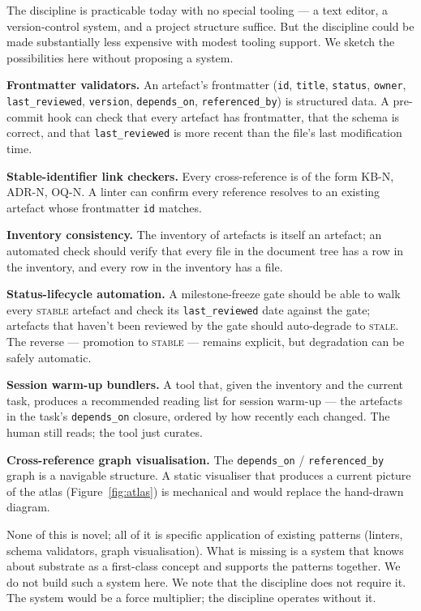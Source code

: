 \documentclass[11pt,a4paper,twocolumn]{article}
\begin{document}
The discipline is practicable today with no special tooling --- a
text editor, a version-control system, and a project structure
suffice. But the discipline could be made substantially less
expensive with modest tooling support. We sketch the possibilities
here without proposing a system.

\textbf{Frontmatter validators.} An artefact's frontmatter
(\texttt{id}, \texttt{title}, \texttt{status}, \texttt{owner},
\texttt{last\_reviewed}, \texttt{version},
\texttt{depends\_on}, \texttt{referenced\_by}) is structured data.
A pre-commit hook can check that every artefact has frontmatter,
that the schema is correct, and that \texttt{last\_reviewed} is
more recent than the file's last modification time.

\textbf{Stable-identifier link checkers.} Every cross-reference is
of the form KB-N, ADR-N, OQ-N. A linter can confirm every
reference resolves to an existing artefact whose frontmatter
\texttt{id} matches.

\textbf{Inventory consistency.} The inventory of artefacts is
itself an artefact; an automated check should verify that every
file in the document tree has a row in the inventory, and every
row in the inventory has a file.

\textbf{Status-lifecycle automation.} A milestone-freeze gate
should be able to walk every \textsc{stable} artefact and check
its \texttt{last\_reviewed} date against the gate; artefacts that
haven't been reviewed by the gate should auto-degrade to
\textsc{stale}. The reverse --- promotion to \textsc{stable} ---
remains explicit, but degradation can be safely automatic.

\textbf{Session warm-up bundlers.} A tool that, given the
inventory and the current task, produces a recommended reading
list for session warm-up --- the artefacts in the task's
\texttt{depends\_on} closure, ordered by how recently each
changed. The human still reads; the tool just curates.

\textbf{Cross-reference graph visualisation.} The
\texttt{depends\_on} / \texttt{referenced\_by} graph is a navigable
structure. A static visualiser that produces a current picture of
the atlas (Figure~\ref{fig:atlas}) is mechanical and would replace
the hand-drawn diagram.

None of this is novel; all of it is specific application of
existing patterns (linters, schema validators, graph
visualisation). What is missing is a system that knows about
substrate as a first-class concept and supports the patterns
together. We do not build such a system here. We note that the
discipline does not require it. The system would be a force
multiplier; the discipline operates without it.
\end{document}
